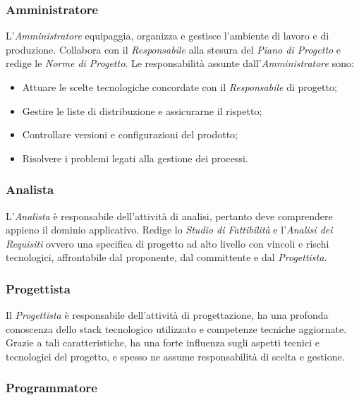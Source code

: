 	\subsubsection{Amministratore}
	
	L'\textit{Amministratore} equipaggia, organizza e gestisce l'ambiente di lavoro e di produzione. Collabora con il \textit{Responsabile} alla stesura del \textit{Piano di Progetto} e redige le \textit{Norme di Progetto}.
	Le responsabilità assunte dall'\textit{Amministratore} sono:

	\begin{itemize}

		\item Attuare le scelte tecnologiche concordate con il \textit{Responsabile} di progetto;
		\item Gestire le liste di distribuzione e assicurarne il rispetto;
		\item Controllare versioni e configurazioni del prodotto;
		\item Risolvere i problemi legati alla gestione dei processi.

	\end{itemize}

	\subsubsection{Analista}

	L'\textit{Analista} è responsabile dell'attività di analisi, pertanto deve comprendere appieno il dominio applicativo. Redige lo \textit{Studio di Fattibilità} e l'\textit{Analisi dei Requisiti} ovvero una specifica di progetto ad alto livello con vincoli e rischi tecnologici, affrontabile dal proponente, dal committente e dal \textit{Progettista}.


	\subsubsection{Progettista}

	Il \textit{Progettista} è responsabile dell'attività di progettazione, ha una profonda conoscenza dello stack tecnologico utilizzato e competenze tecniche aggiornate. Grazie a tali caratteristiche, ha una forte influenza sugli aspetti tecnici e tecnologici del progetto, e spesso ne assume responsabilità di scelta e gestione.


	\subsubsection{Programmatore}

